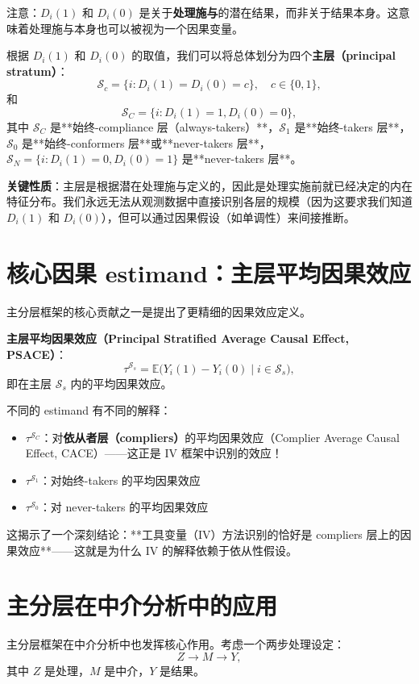 注意：$D_i(1)$ 和 $D_i(0)$ 是关于\textbf{处理施与}的潜在结果，而非关于结果本身。这意味着处理施与本身也可以被视为一个因果变量。

根据 $D_i(1)$ 和 $D_i(0)$ 的取值，我们可以将总体划分为四个\textbf{主层（principal stratum）}：
\[
\mathcal{S}_c = \{i : D_i(1) = D_i(0) = c\}, \quad c \in \{0, 1\},
\]
和
\[
\mathcal{S}_C = \{i : D_i(1) = 1, D_i(0) = 0\},
\]
其中 $\mathcal{S}_C$ 是**始终-compliance 层（always-takers）**，$\mathcal{S}_1$ 是**始终-takers 层**，$\mathcal{S}_0$ 是**始终-conformers 层**或**never-takers 层**，$\mathcal{S}_N = \{i : D_i(1) = 0, D_i(0) = 1\}$ 是**never-takers 层**。

\textbf{关键性质}：主层是根据潜在处理施与定义的，因此是处理实施前就已经决定的内在特征分布。我们永远无法从观测数据中直接识别各层的规模（因为这要求我们知道 $D_i(1)$ 和 $D_i(0)$），但可以通过因果假设（如单调性）来间接推断。

\section{核心因果 estimand：主层平均因果效应}\label{sec:26-place-ace}

主分层框架的核心贡献之一是提出了更精细的因果效应定义。

\textbf{主层平均因果效应（Principal Stratified Average Causal Effect, PSACE）}：
\[
\tau^{\mathcal{S}_s} = \mathbb{E}\bigl( Y_i(1) - Y_i(0) \mid i \in \mathcal{S}_s \bigr),
\]
即在主层 $\mathcal{S}_s$ 内的平均因果效应。

不同的 estimand 有不同的解释：
\begin{itemize}
  \item $\tau^{\mathcal{S}_C}$：对\textbf{依从者层（compliers）}的平均因果效应（Complier Average Causal Effect, CACE）——这正是 IV 框架中识别的效应！
  \item $\tau^{\mathcal{S}_1}$：对始终-takers 的平均因果效应
  \item $\tau^{\mathcal{S}_0}$：对 never-takers 的平均因果效应
\end{itemize}

这揭示了一个深刻结论：**工具变量（IV）方法识别的恰好是 compliers 层上的因果效应**——这就是为什么 IV 的解释依赖于依从性假设。

\section{主分层在中介分析中的应用}\label{sec:26-mediation}

主分层框架在中介分析中也发挥核心作用。考虑一个两步处理设定：
\[
Z \rightarrow M \rightarrow Y,
\]
其中 $Z$ 是处理，$M$ 是中介，$Y$ 是结果。

